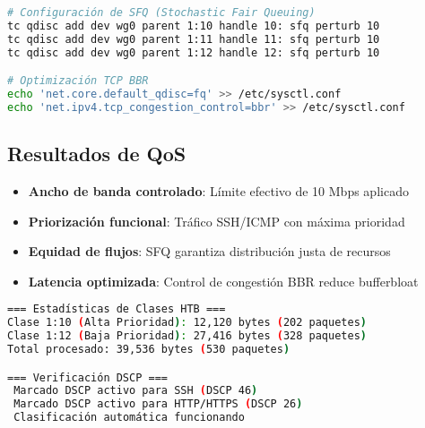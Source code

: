 \begin{lstlisting}[language=bash, caption=Control de congestión y queue management]
# Configuración de SFQ (Stochastic Fair Queuing)
tc qdisc add dev wg0 parent 1:10 handle 10: sfq perturb 10
tc qdisc add dev wg0 parent 1:11 handle 11: sfq perturb 10
tc qdisc add dev wg0 parent 1:12 handle 12: sfq perturb 10

# Optimización TCP BBR
echo 'net.core.default_qdisc=fq' >> /etc/sysctl.conf
echo 'net.ipv4.tcp_congestion_control=bbr' >> /etc/sysctl.conf
\end{lstlisting}

\subsection{Resultados de QoS}

\begin{destacado}
\begin{itemize}
    \item \textbf{Ancho de banda controlado}: Límite efectivo de 10 Mbps aplicado
    \item \textbf{Priorización funcional}: Tráfico SSH/ICMP con máxima prioridad
    \item \textbf{Equidad de flujos}: SFQ garantiza distribución justa de recursos
    \item \textbf{Latencia optimizada}: Control de congestión BBR reduce bufferbloat
\end{itemize}
\end{destacado}

\begin{lstlisting}[language=bash, caption=Estadísticas de tráfico capturadas]
=== Estadísticas de Clases HTB ===
Clase 1:10 (Alta Prioridad): 12,120 bytes (202 paquetes)
Clase 1:12 (Baja Prioridad): 27,416 bytes (328 paquetes)
Total procesado: 39,536 bytes (530 paquetes)

=== Verificación DSCP ===
 Marcado DSCP activo para SSH (DSCP 46)
 Marcado DSCP activo para HTTP/HTTPS (DSCP 26)
 Clasificación automática funcionando
\end{lstlisting}
